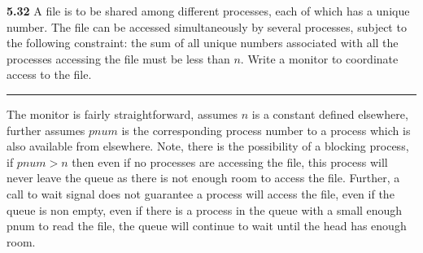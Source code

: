 \documentclass[12pt]{jhwhw}
\begin{document}
\textbf{5.32}  
	A file is to be shared among different processes, each of which has a unique number.
	The file can be accessed simultaneously by several processes, subject to the following
	constraint: the sum of all unique numbers associated with all the processes accessing
	the file must be less than $n$. Write a monitor to coordinate access to the file.
\textcolor[RGB]{240,240,240}{\rule{\textwidth}{0.5pt}}\bigbreak

	\begin{addmargin}[1em]{}
		The monitor is fairly straightforward, assumes $n$ is a constant defined elsewhere,
		further assumes $pnum$ is the corresponding process number to a process which
		is also available from elsewhere. Note, there is the possibility of a blocking
		process, if $pnum > n$ then even if no processes are accessing the file, this process
		will never leave the queue as there is not enough room to access the file.
		Further, a call to wait signal does not guarantee a process will access the file,
		even if the queue is non empty, even if there is a process in the queue with a small
		enough pnum to read the file, the queue will continue to wait until the head has
		enough room.
		\inputminted{c}{5.32.c}
	\end{addmargin}
	\bigbreak
\end{document}
